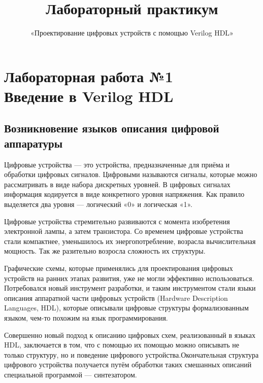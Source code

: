 \documentclass[a5paper, DIV=14, headings=openany, twoside=true,fontsize=10pt, titlepage]{scrreprt}
\newcommand{\quotes}[1]{«#1»}
\newcommand{\eng}[1]{\foreignlanguage{english}{#1}}
\begin{document}
\rofoot*{\pagemark}
\lofoot*{}
\lefoot*{\pagemark}

\sloppy

\title{Лабораторный практикум}
\author{}
\subject{}
\subtitle{\quotes{Проектирование цифровых устройств с помощью \eng{Verilog HDL}}}
\titlehead{}
\publishers{}
\date{}


\maketitle{}


\chapter{Лабораторная работа №1\\Введение в Verilog HDL} 
\section{Возникновение языков описания цифровой аппаратуры}

\par{Цифровые устройства — это устройства, предназначенные для приёма и обработки цифровых сигналов. Цифровыми называются сигналы, которые можно рассматривать в виде набора дискретных уровней. В цифровых сигналах информация кодируется в виде конкретного уровня напряжения. Как правило выделяется два уровня — логический «0» и логическая «1».}

\par{Цифровые устройства стремительно развиваются с момента изобретения электронной лампы, а затем транзистора. Со временем цифровые устройства стали компактнее, уменьшилось их энергопотребление, возрасла вычислительная мощность. Так же разительно возросла сложность их структуры.}

\par{Графические схемы, которые применялись для проектирования цифровых устройств на ранних этапах развития, уже не могли эффективно использоваться. Потребовался новый инструмент разработки, и таким инструментом стали языки описания аппаратной части цифровых устройств (\eng{Hardware Description Languages, HDL}), которые описывали цифровые структуры формализованным языком, чем-то похожим на язык программирования.}

\par{Совершенно новый подход к описанию цифровых схем, реализованный в языках \eng{HDL}, заключается в том, что с помощью их помощью можно описывать не только структуру, но и поведение цифрового устройства.Окончательная структура цифрового устройства получается путём обработки таких смешанных описаний специальной программой — синтезатором.}
\end{document}
